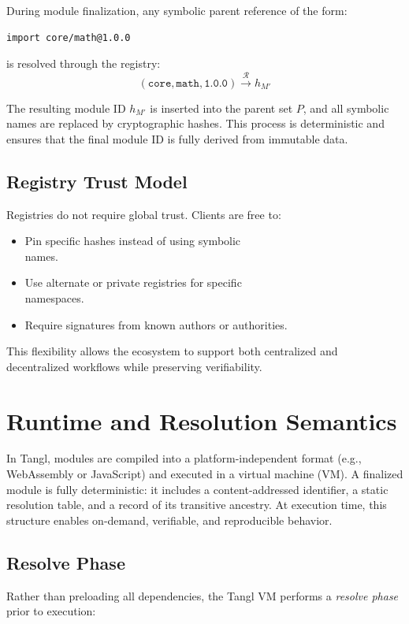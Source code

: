 \documentclass[sigplan,screen]{acmart}
\begin{document}
During module finalization, any symbolic parent reference of the form:
\begin{verbatim}
import core/math@1.0.0
\end{verbatim}
is resolved through the registry:
\[
	(\texttt{core}, \texttt{math}, \texttt{1.0.0}) \xrightarrow{\mathcal{R}} h_{M'}
\]

The resulting module ID $h_{M'}$ is inserted into the parent set $P$, and all symbolic names are replaced by cryptographic hashes. This process is deterministic and ensures that the final module ID is fully derived from immutable data.

\subsection{Registry Trust Model}

Registries do not require global trust. Clients are free to:
\begin{itemize}
	\item Pin specific hashes instead of using symbolic \\names.
	\item Use alternate or private registries for specific \\namespaces.
	\item Require signatures from known authors or authorities.
\end{itemize}

This flexibility allows the ecosystem to support both centralized and decentralized workflows while preserving verifiability.

\section{Runtime and Resolution Semantics}
\label{sec:runtime-resolution-semantics}

In Tangl, modules are compiled into a platform-indep\-endent format (e.g., WebAssembly or JavaScript) and executed in a virtual machine (VM). A finalized module is fully deterministic: it includes a content-addressed identifier, a static resolution table, and a record of its transitive ancestry. At execution time, this structure enables on-demand, verifiable, and reproducible behavior.

\subsection{Resolve Phase}

Rather than preloading all dependencies, the Tangl VM performs a \emph{resolve phase} prior to execution:
\end{document}
